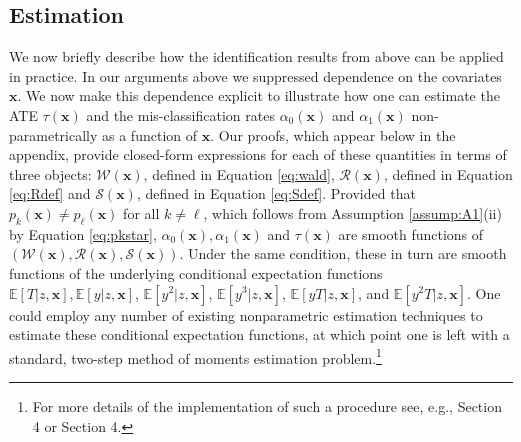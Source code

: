 \subsection{Estimation}
We now briefly describe how the identification results from above can be applied in practice.
In our arguments above we suppressed dependence on the covariates $\mathbf{x}$. 
We now make this dependence explicit to illustrate how one can estimate the ATE $\tau(\mathbf{x})$ and the mis-classification rates $\alpha_0(\mathbf{x})$ and $\alpha_1(\mathbf{x})$ non-parametrically as a function of $\mathbf{x}$.
Our proofs, which appear below in the appendix, provide closed-form expressions for each of these quantities in terms of three objects: $\mathcal{W}(\mathbf{x})$, defined in Equation \ref{eq:wald}, $\mathcal{R}(\mathbf{x})$, defined in Equation \ref{eq:Rdef} and $\mathcal{S}(\mathbf{x})$, defined in Equation \ref{eq:Sdef}.
Provided that $p_k(\mathbf{x}) \neq p_\ell(\mathbf{x})$ for all $k\neq \ell$, which follows from Assumption \ref{assump:A1}(ii) by Equation \ref{eq:pkstar},  $\alpha_0(\mathbf{x}), \alpha_1(\mathbf{x})$ and $\tau(\mathbf{x})$ are smooth functions of $\left(\mathcal{W}(\mathbf{x}), \mathcal{R}(\mathbf{x}), \mathcal{S}(\mathbf{x})\right)$.
Under the same condition, these in turn are smooth functions of  the underlying conditional expectation functions $ \mathbb{E}\left[ T|z,\mathbf{x} \right], \mathbb{E}\left[y| z,\mathbf{x} \right]$, $\mathbb{E}\left[y^2| z,\mathbf{x} \right]$, $\mathbb{E}\left[y^3| z,\mathbf{x} \right]$, $\mathbb{E}\left[yT| z,\mathbf{x} \right]$, and  $\mathbb{E}\left[y^2T| z,\mathbf{x} \right]$.
One could employ any number of existing nonparametric estimation techniques to estimate these conditional expectation functions, at which point one is left with a standard, two-step method of moments estimation problem.\footnote{For more details of the implementation of such a procedure see, e.g., \cite{Mahajan} Section 4 or \cite{Lewbel} Section 4.}
